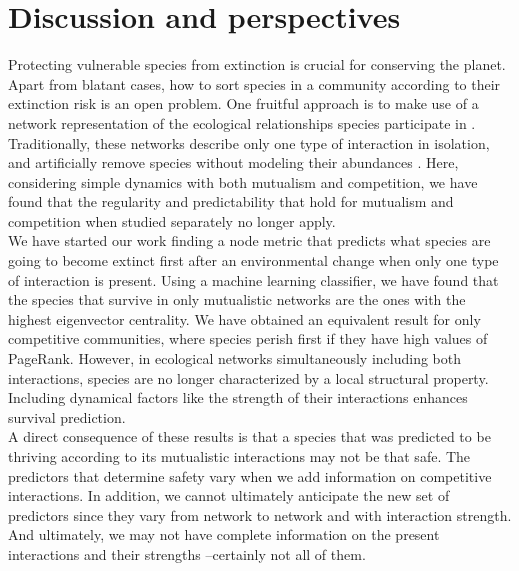 \section{Discussion and perspectives} \label{chp2:4}

Protecting vulnerable species from extinction is crucial for conserving the planet. Apart from blatant cases, how to sort species in a community according to their extinction risk is an open problem. One fruitful approach is to make use of a network representation of the ecological relationships species participate in \cite{pascual2006ecological}. Traditionally, these networks describe only one type of interaction in isolation, and artificially remove species without modeling their abundances \cite{Sole2001}. Here, considering simple dynamics with both mutualism and competition, we have found that the regularity and predictability that hold for mutualism and competition when studied separately no longer apply. \\

We have started our work finding a node metric that predicts what species are going to become extinct first after an environmental change when only one type of interaction is present. Using a machine learning classifier, we have found that the species that survive in only mutualistic networks are the ones with the highest eigenvector centrality. We have obtained an equivalent result for only competitive communities, where species perish first if they have high values of PageRank. However, in ecological networks simultaneously including both interactions, species are no longer characterized by a local structural property. Including dynamical factors like the strength of their interactions enhances survival prediction. \\

A direct consequence of these results is that a species that was predicted to be thriving according to its mutualistic interactions may not be that safe. The predictors that determine safety vary when we add information on competitive interactions. In addition, we cannot ultimately anticipate the new set of predictors since they vary from network to network and with interaction strength.  And ultimately, we may not have complete information on the present interactions and their strengths --certainly not all of them. \\


